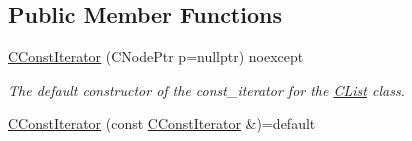 \subsection*{Public Member Functions}
\begin{DoxyCompactItemize}
\item 
\hyperlink{structnsSdD_1_1CList_1_1CConstIterator_a2a5d916c0ecc7397ade18c0e612f8b8a}{C\+Const\+Iterator} (C\+Node\+Ptr p=nullptr) noexcept
\begin{DoxyCompactList}\small\item\em The default constructor of the const\+\_\+iterator for the \hyperlink{classnsSdD_1_1CList}{C\+List} class. \end{DoxyCompactList}\item 
\hypertarget{structnsSdD_1_1CList_1_1CConstIterator_a4f1976b5f8708e35f927e946905a16d5}{\hyperlink{structnsSdD_1_1CList_1_1CConstIterator_a4f1976b5f8708e35f927e946905a16d5}{C\+Const\+Iterator} (const \hyperlink{structnsSdD_1_1CList_1_1CConstIterator}{C\+Const\+Iterator} \&)=default}\label{structnsSdD_1_1CList_1_1CConstIterator_a4f1976b5f8708e35f927e946905a16d5}


\end{DoxyCompactItemize}
